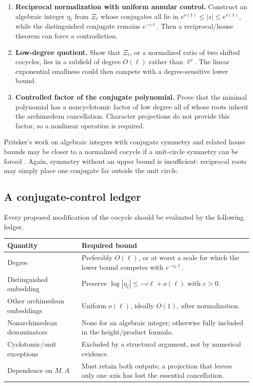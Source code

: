 \documentclass[10pt,letterpaper]{article}
\begin{document}
\begin{enumerate}
\item \textbf{Reciprocal normalization with uniform annular control.}
Construct an algebraic integer \(\eta_\ell\) from \(\Xi_\ell\) whose conjugates all lie in
\(e^{o(1)}\leq |z|\leq e^{o(1)}\), while the distinguished conjugate remains
\(e^{-c\ell}\).  Then a reciprocal/house theorem can force a contradiction.

\item \textbf{Low-degree quotient.}
Show that \(\Xi_\ell\), or a normalized ratio of two shifted cocycles, lies in a subfield of
degree \(O(\ell)\) rather than \(\ell^\rho\).  The linear exponential smallness could then
compete with a degree-sensitive lower bound.

\item \textbf{Controlled factor of the conjugate polynomial.}
Prove that the minimal polynomial has a noncyclotomic factor of low degree all of whose roots
inherit the archimedean cancellation.  Character projections do not provide this factor, so
a nonlinear operation is required.
\end{enumerate}

Pritsker's work on algebraic integers with conjugate symmetry and related house bounds may be
closer to a normalized cocycle if a unit-circle symmetry can be forced
\cite{PritskerHouse}.  Again, symmetry without an upper bound is insufficient: reciprocal
roots may simply place one conjugate far outside the unit circle.

\subsection{A conjugate-control ledger}

Every proposed modification of the cocycle should be evaluated by the following ledger.

\begin{center}
\small
\begin{tabularx}{0.96\textwidth}{L{0.23\textwidth}Y}
\toprule
Quantity & Required bound\\
\midrule
Degree & Preferably \(O(\ell)\), or at worst a scale for which the lower bound competes with
\(e^{-c_0\ell}\).\\
Distinguished embedding & Preserve \(\log|\eta_\ell|\leq-c\ell+o(\ell)\) with \(c>0\).\\
Other archimedean embeddings & Uniform \(o(\ell)\), ideally \(O(1)\), after normalization.\\
Nonarchimedean denominators & None for an algebraic integer; otherwise fully included in the
height/product formula.\\
Cyclotomic/unit exceptions & Excluded by a structural argument, not by numerical evidence.\\
Dependence on \(M,A\) & Must retain both outputs; a projection that leaves only one axis has
lost the essential cancellation.\\
\bottomrule
\end{tabularx}
\end{center}
\end{document}
